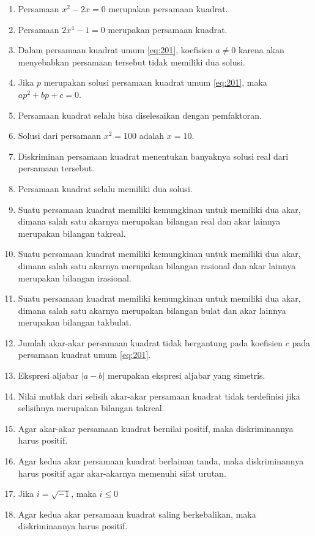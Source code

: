 	\begin{enumerate}[topsep=0pt]
		\item Persamaan $ x^{2} - 2x = 0 $ merupakan persamaan kuadrat.
		\item Persamaan $ 2x^{4} - 1 = 0 $ merupakan persamaan kuadrat.
		\item Dalam persamaan kuadrat umum \ref{eq:201}, koefisien $ a \ne 0 $ karena akan menyebabkan persamaan tersebut tidak memiliki dua solusi.
		\item Jika $ p $ merupakan solusi persamaan kuadrat umum \ref{eq:201}, maka $ ap^{2} + bp + c = 0 $.
		\item Persamaan kuadrat selalu bisa diselesaikan dengan pemfaktoran.
		\item Solusi dari persamaan $ x^{2} = 100 $ adalah $ x = 10 $.
		\item Diskriminan persamaan kuadrat menentukan banyaknya solusi real dari persamaan tersebut.
		\item Persamaan kuadrat selalu memiliki dua solusi.
		\item Suatu persamaan kuadrat memiliki kemungkinan untuk memiliki dua akar, dimana salah satu akarnya merupakan bilangan real dan akar lainnya merupakan bilangan takreal.
		\item Suatu persamaan kuadrat memiliki kemungkinan untuk memiliki dua akar, dimana salah satu akarnya merupakan bilangan rasional dan akar lainnya merupakan bilangan irasional.
		\item Suatu persamaan kuadrat memiliki kemungkinan untuk memiliki dua akar, dimana salah satu akarnya merupakan bilangan bulat dan akar lainnya merupakan bilangan takbulat.
		\item Jumlah akar-akar persamaan kuadrat tidak bergantung pada koefisien $ c $ pada persamaan kuadrat umum \ref{eq:201}.
		\item Ekspresi aljabar $ \left|a - b\right| $ merupakan ekspresi aljabar yang simetris.
		\item Nilai mutlak dari selisih akar-akar persamaan kuadrat tidak terdefinisi jika selisihnya merupakan bilangan takreal.
		\item Agar akar-akar persamaan kuadrat bernilai positif, maka diskriminannya harus positif.
		\item Agar kedua akar persamaan kuadrat berlainan tanda, maka diskriminannya harus positif agar akar-akarnya memenuhi sifat urutan.
		\item Jika $ i = \sqrt{-1} $, maka $ i \leq 0 $
		\item Agar kedua akar persamaan kuadrat saling berkebalikan, maka diskriminannya harus positif.

\end{enumerate}
